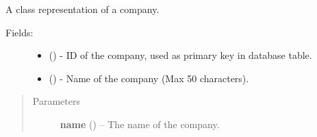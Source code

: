 \documentclass[letterpaper,10pt,english]{sphinxmanual}
\begin{document}

\begin{fulllineitems}
\label{api:models.Company}
A class representation of a company.
\begin{description}
\item[{Fields:}] \leavevmode\begin{itemize}
\item {} 
 () - ID of the company, used as primary key in database table.

\item {} 
 () - Name of the company (Max 50 characters).

\end{itemize}

\end{description}
\begin{quote}\begin{description}
\item[{Parameters}] \leavevmode
\textbf{name} () -- The name of the company.

\end{description}\end{quote}

\end{fulllineitems}

\end{document}
